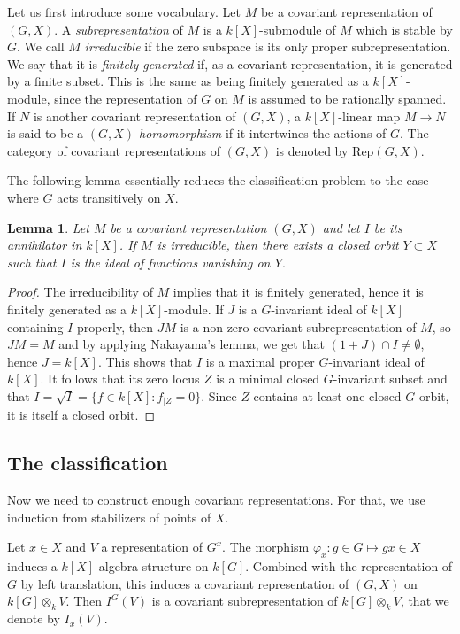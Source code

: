 \documentclass{amsart}
\newtheorem{lemma}[theorem]{Lemma}
\theoremstyle{definition}
\begin{document}
Let us first introduce some vocabulary. Let $M$ be a covariant representation of $(G,X)$. A \textit{subrepresentation} of $M$ is a $k[X]$-submodule of $M$ which is stable by $G$. We call $M$ \textit{irreducible} if the zero subspace is its only proper subrepresentation. We say that it is \textit{finitely generated} if, as a covariant representation, it is generated by a finite subset. This is the same as being finitely generated as a $k[X]$-module, since the representation of $G$ on $M$ is assumed to be rationally spanned. If $N$ is another covariant representation of $(G,X)$, a $k[X]$-linear map $M \to N$ is said to be a \textit{$(G,X)$-homomorphism} if it intertwines the actions of $G$. The category of covariant representations of $(G,X)$ is denoted by $\mathrm{Rep}(G,X)$.

The following lemma essentially reduces the classification problem to the case where $G$ acts transitively on $X$.

\begin{lemma}\label{annihilator}
Let $M$ be a covariant representation $(G, X)$ and let $I$ be its annihilator in $k[X]$. If $M$ is irreducible, then there exists a closed orbit $Y \subset X$ such that $I$ is the ideal of functions vanishing on $Y$.
\end{lemma}

\begin{proof} The irreducibility of $M$ implies that it is finitely generated, hence it is finitely generated as a $k[X]$-module. If $J$ is a $G$-invariant ideal of $k[X]$ containing $I$ properly, then $JM$ is a non-zero covariant subrepresentation of $M$, so $JM = M$ and by applying Nakayama's lemma, we get that $(1 + J) \cap I \neq \emptyset$, hence $J = k[X]$. This shows that $I$ is a maximal proper $G$-invariant ideal of $k[X]$. It follows that its zero locus $Z$ is a minimal closed $G$-invariant subset and that $I = \sqrt{I} = \{ f \in k[X] : f_{|Z} = 0 \}$. Since $Z$ contains at least one closed $G$-orbit, it is itself a closed orbit.
\end{proof}

\subsection{The classification} Now we need to construct enough covariant representations. For that, we use induction from stabilizers of points of $X$.

Let $x \in X$ and $V$ a representation of $G^x$. The morphism $\varphi_x : g \in G \mapsto gx \in X$ induces a $k[X]$-algebra structure on $k[G]$. Combined with the representation of $G$ by left translation, this induces a covariant representation of $(G,X)$ on $k[G] \otimes_k V$. Then $I^G(V)$ is a covariant subrepresentation of $k[G] \otimes_k V$, that we denote by $I_x(V)$.
\end{document}

